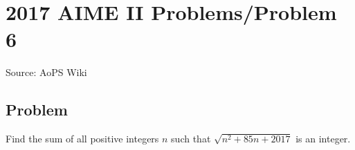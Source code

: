 \documentclass[12pt]{article}
\begin{document}
\section*{{2017 AIME II Problems/Problem 6}}
Source: AoPS Wiki

\subsection*{Problem}
Find the sum of all positive integers $n$ such that $\sqrt{n^2+85n+2017}$ is an integer.
\end{document}
